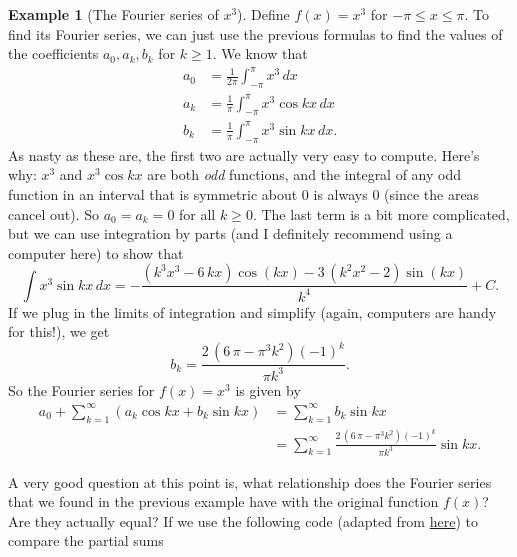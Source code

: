 \documentclass[10pt,]{book}
\theoremstyle{plain}
\theoremstyle{definition}
\theoremstyle{definition}
\newtheorem{example}[theorem]{Example}
\numberwithin{equation}{section}
\begin{document}
\begin{example}[The Fourier series of \(x^{3}\)]\label{example-fourier-series-of-absolute-value}
Define \(f(x) = x^{3}\) for \(-\pi\leq x\leq \pi\). To find its Fourier series, we can just use the previous formulas to find the values of the coefficients \(a_{0},a_{k},b_{k}\) for \(k\geq1\). We know that
                \begin{align*}
a_{0} & = \frac{1}{2\pi}\int_{-\pi}^{\pi}x^{3}\,dx\\
a_{k} & = \frac{1}{\pi}\int_{-\pi}^{\pi}x^{3}\cos kx\,dx \\
b_{k} & = \frac{1}{\pi}\int_{-\pi}^{\pi}x^{3}\sin kx\,dx.
\end{align*}
                As nasty as these are, the first two are actually very easy to compute. Here's why: \(x^{3}\) and \(x^{3}\cos kx\) are both \emph{odd} functions, and the integral of any odd function in an interval that is symmetric about \(0\) is always \(0\) (since the areas cancel out). So \(a_{0} = a_{k} = 0\) for all \(k\geq0\). The last term is a bit more complicated, but we can use integration by parts (and I definitely recommend using a computer here) to show that
                \begin{equation*}
                    \int x^{3}\sin kx\,dx = -\frac{{\left(k^{3} x^{3} - 6 \, k x\right)} \cos\left(k x\right) - 3 \, {\left(k^{2} x^{2} - 2\right)} \sin\left(k x\right)}{k^{4}} + C.
                \end{equation*}
                If we plug in the limits of integration and simplify (again, computers are handy for this!), we get
                \begin{equation*}
                    b_{k} = \frac{2 \, {\left(6 \, \pi - \pi^{3} k^{2}\right)} \left(-1\right)^{k}}{\pi k^{3}}.
                \end{equation*}
                So the Fourier series for \(f(x) = x^{3}\) is given by
                \begin{align*}
a_{0} + \sum_{k=1}^{\infty}(a_{k}\cos kx+b_{k}\sin kx) &= \sum_{k=1}^{\infty}b_{k}\sin kx \\
 &= \sum_{k=1}^{\infty}\frac{2 \, {\left(6 \, \pi - \pi^{3} k^{2}\right)} \left(-1\right)^{k}}{\pi k^{3}}\sin kx. 
\end{align*}
\end{example}
\par
A very good question at this point is, what relationship does the Fourier series that we found in the previous example have with the original function \(f(x)\)? Are they actually equal? If we use the following code (adapted from \href{https://doxdrum.wordpress.com/2011/01/31/sage-tip-fourier-series-approximation/}{here}) to compare the partial sums
\end{document}
